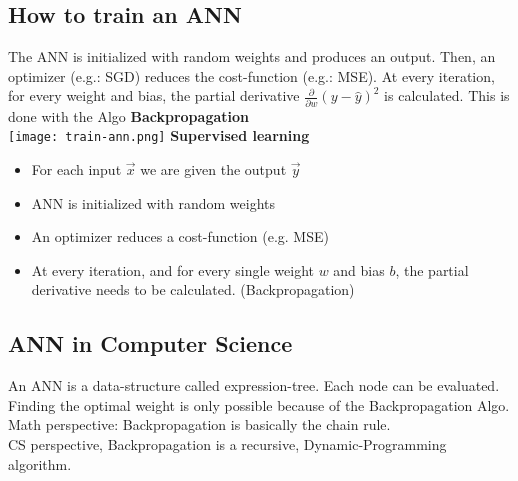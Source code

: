 \subsection{How to train an ANN}
The ANN is initialized with random weights and produces an output.
Then, an optimizer (e.g.: SGD) reduces the cost-function (e.g.: MSE).
At every iteration, for every weight and bias, the partial derivative $\frac{\partial}{\partial w}(y - \hat{y})^2$ is calculated.
This is done with the Algo \textbf{Backpropagation}\\
\texttt{[image: train-ann.png]}
\textbf{Supervised learning}
\begin{itemize}
    \item For each input $\vec{x}$ we are given the output $\vec{y}$
    \item ANN is initialized with random weights
    \item An optimizer reduces a cost-function (e.g. MSE)
    \item At every iteration, and for every single weight $w$ and bias $b$, the partial derivative needs to be calculated. (Backpropagation)
\end{itemize}
\subsection{ANN in Computer Science}
An ANN is a data-structure called expression-tree. 
Each node can be evaluated.
Finding the optimal weight is only possible because of the Backpropagation Algo.\\
Math perspective: Backpropagation is basically the chain rule.\\
CS perspective, Backpropagation is a recursive, Dynamic-Programming algorithm.
